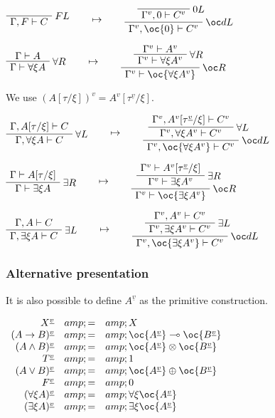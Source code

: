 \(\LabelRule{F L}
\NulRule{\Gamma,F\vdash C}
\DisplayProof
\qquad\mapsto\qquad
\LabelRule{\zero L}
\NulRule{\Gamma^v,\zero\vdash C^v}
\LabelRule{\oc d L}
\UnaRule{\Gamma^v,\oc{\zero}\vdash C^v}
\DisplayProof\)

\(\AxRule{\Gamma\vdash A}
\LabelRule{\forall R}
\UnaRule{\Gamma\vdash \forall\xi A}
\DisplayProof
\qquad\mapsto\qquad
\AxRule{\Gamma^v\vdash A^v}
\LabelRule{\forall R}
\UnaRule{\Gamma^v\vdash \forall\xi A^v}
\LabelRule{\oc R}
\UnaRule{\Gamma^v\vdash \oc{\forall\xi A^v}}
\DisplayProof\)

We use \((A[\tau/\xi])^v=A^v[\tau^{\underline{v}}/\xi]\).

\(\AxRule{\Gamma,A[\tau/\xi]\vdash C}
\LabelRule{\forall L}
\UnaRule{\Gamma,\forall\xi A\vdash C}
\DisplayProof
\qquad\mapsto\qquad
\AxRule{\Gamma^v,A^v[\tau^{\underline{v}}/\xi]\vdash C^v}
\LabelRule{\forall L}
\UnaRule{\Gamma^v,\forall\xi A^v\vdash C^v}
\LabelRule{\oc d L}
\UnaRule{\Gamma^v,\oc{\forall\xi A^v}\vdash C^v}
\DisplayProof\)

\(\AxRule{\Gamma\vdash A[\tau/\xi]}
\LabelRule{\exists R}
\UnaRule{\Gamma\vdash \exists\xi A}
\DisplayProof
\qquad\mapsto\qquad
\AxRule{\Gamma^v\vdash A^v[\tau^{\underline{v}}/\xi]}
\LabelRule{\exists R}
\UnaRule{\Gamma^v\vdash \exists\xi A^v}
\LabelRule{\oc R}
\UnaRule{\Gamma^v\vdash \oc{\exists\xi A^v}}
\DisplayProof\)

\(\AxRule{\Gamma,A\vdash C}
\LabelRule{\exists L}
\UnaRule{\Gamma,\exists\xi A\vdash C}
\DisplayProof
\qquad\mapsto\qquad
\AxRule{\Gamma^v,A^v\vdash C^v}
\LabelRule{\exists L}
\UnaRule{\Gamma^v,\exists\xi A^v\vdash C^v}
\LabelRule{\oc d L}
\UnaRule{\Gamma^v,\oc{\exists\xi A^v}\vdash C^v}
\DisplayProof\)

\subsubsection{Alternative
presentation}\label{alternative-presentation-2}

It is also possible to define \(A^{\underline{v}}\) as the primitive
construction.

\(\begin{array}{rcl}
X^{\underline{v}} &amp; = &amp; X \\
(A\imp B)^{\underline{v}} &amp; = &amp; \oc{A^{\underline{v}}}\limp\oc{B^{\underline{v}}} \\
(A\wedge B)^{\underline{v}} &amp; = &amp; \oc{A^{\underline{v}}}\tens\oc{B^{\underline{v}}} \\
T^{\underline{v}} &amp; = &amp; \one \\
(A\vee B)^{\underline{v}} &amp; = &amp; \oc{A^{\underline{v}}}\plus\oc{B^{\underline{v}}} \\
F^{\underline{v}} &amp; = &amp; \zero \\
(\forall\xi A)^{\underline{v}} &amp; = &amp; \forall\xi \oc{A^{\underline{v}}} \\
(\exists\xi A)^{\underline{v}} &amp; = &amp; \exists\xi \oc{A^{\underline{v}}}
\end{array}\)

